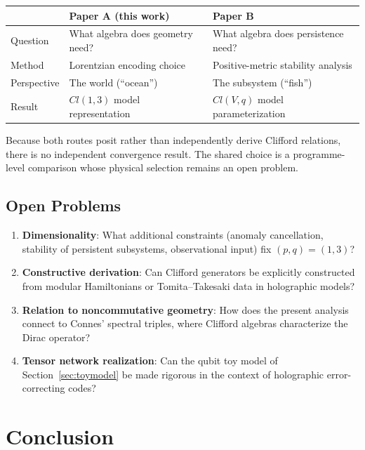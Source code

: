 \documentclass[12pt]{article}
\begin{document}
\begin{center}
\begin{tabular}{@{}lll@{}}
\toprule
& \textbf{Paper A (this work)} & \textbf{Paper B} \\
\midrule
Question & What algebra does geometry need? & What algebra does persistence need? \\
Method & Lorentzian encoding choice & Positive-metric stability analysis \\
Perspective & The world (``ocean'') & The subsystem (``fish'') \\
Result & $Cl(1,3)$ model representation & $Cl(V,q)$ model parameterization \\
\bottomrule
\end{tabular}
\end{center}

Because both routes posit rather than independently derive Clifford relations, there is no independent convergence result.  The shared choice is a programme-level comparison whose physical selection remains an open problem.

\subsection{Open Problems}

\begin{enumerate}
\item \textbf{Dimensionality}: What additional constraints (anomaly cancellation, stability of persistent subsystems, observational input) fix $(p,q) = (1,3)$?
\item \textbf{Constructive derivation}: Can Clifford generators be explicitly constructed from modular Hamiltonians or Tomita--Takesaki data in holographic models?
\item \textbf{Relation to noncommutative geometry}: How does the present analysis connect to Connes' spectral triples, where Clifford algebras characterize the Dirac operator?
\item \textbf{Tensor network realization}: Can the qubit toy model of Section~\ref{sec:toymodel} be made rigorous in the context of holographic error-correcting codes?
\end{enumerate}

\section{Conclusion}
\end{document}
